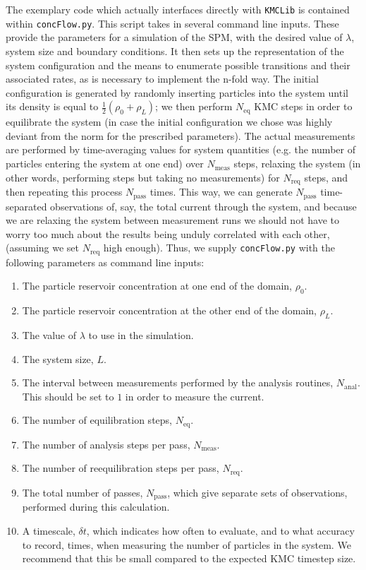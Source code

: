 The exemplary code which actually interfaces directly with \texttt{KMCLib} is contained within 
\texttt{concFlow.py}. This script takes in several command line inputs. These provide the parameters for
a simulation of the SPM, with the desired value of $\lambda$, system size and boundary conditions. It 
then sets up the representation of the system configuration and the means to enumerate possible
transitions and their associated rates, as is necessary to implement the n-fold way.
The initial configuration is generated by randomly inserting particles into the system until its density
is equal to $\frac{1}{2}\left(\rho_0 + \rho_L \right)$; we then perform $N_{\mathrm{eq}}$ KMC steps in order to 
equilibrate the system (in case the initial configuration we chose was highly deviant from the norm
for the prescribed parameters). The actual measurements are performed by time-averaging values for system
quantities (e.g. the number of particles entering the system at one end) over $N_{\mathrm{meas}}$ steps,
relaxing the system (in other words, performing steps but taking no measurements) for $N_{\mathrm{req}}$ steps,
and then repeating this process $N_{\mathrm{pass}}$ times. This way, we can generate $N_{\mathrm{pass}}$ time-separated 
observations of, say, the total current through the system, and because we are relaxing the system 
between measurement runs we should not have to worry too much about the results being unduly correlated
with each other, (assuming we set $N_{\mathrm{req}}$ high enough).
Thus, we supply \texttt{concFlow.py} with the following parameters as 
command line inputs:
\begin{enumerate}
 \item The particle reservoir concentration at one end of the domain, $\rho_0$.
 \item The particle reservoir concentration at the other end of the domain, $\rho_L$.
 \item The value of $\lambda$ to use in the simulation.
 \item The system size, $L$.
 \item The interval between measurements performed by the analysis
 routines, $N_{\mathrm{anal}}$. This should be set to $1$ in order to measure the current.
 \item The number of equilibration steps, $N_{\mathrm{eq}}$.
 \item The number of analysis steps per pass, $N_{\mathrm{meas}}$.
 \item The number of reequilibration steps per pass, $N_{\mathrm{req}}$.
 \item The total number of passes, $N_{\mathrm{pass}}$, which give separate
 sets of observations, performed during this calculation.
 \item A timescale, $\delta t$, which indicates how often to evaluate,
 and to what accuracy to record, times, when measuring the number of 
 particles in the system. We recommend that this be small compared to the expected KMC timestep size.
\end{enumerate}

